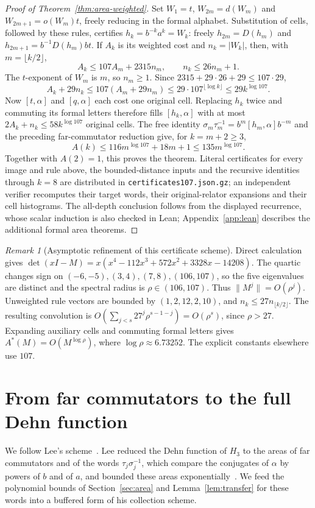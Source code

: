 \documentclass[11pt,a4paper]{article}
\theoremstyle{plain}
\theoremstyle{definition}
\theoremstyle{remark}
\newtheorem{remark}[theorem]{Remark}
\begin{document}
\begin{proof}[Proof of Theorem~\ref{thm:area-weighted}]
Set $W_1=t$, $W_{2m}=d(W_m)$ and $W_{2m+1}=o(W_m)t$, freely reducing in the formal alphabet. Substitution of cells, followed by these
rules, certifies $h_k=b^{-k}a^k=W_k$: freely $h_{2m}=D(h_m)$ and $h_{2m+1}=b^{-1}D(h_m)bt$.
If $A_k$ is its weighted cost and $n_k=|W_k|$, then, with $m=\lfloor k/2\rfloor$,
\[
A_k\le107A_m+2315n_m,\qquad n_k\le26n_m+1.
\]
The $t$-exponent of $W_m$ is $m$, so $n_m\ge1$. Since $2315+29\cdot26+29\le107\cdot29$,
\[
A_k+29n_k\le107(A_m+29n_m)\le29\cdot107^{\lfloor\log k\rfloor}\le29k^{\log107}.
\]
Now $[t,\alpha]$ and $[q,\alpha]$ each cost one original cell. Replacing $h_k$ twice and commuting its formal letters therefore fills
$[h_k,\alpha]$ with at most $2A_k+n_k\le58k^{\log107}$ original cells. The free identity
$\sigma_m\tau_m^{-1}=b^m[h_m,\alpha]b^{-m}$ and the preceding far-commutator reduction give, for $k=m+2\ge3$,
\[
A(k)\le116m^{\log107}+18m+1\le135m^{\log107}.
\]
Together with $A(2)=1$, this proves the theorem. Literal certificates for every image and rule above, the bounded-distance inputs and
the recursive identities through $k=8$ are distributed in \texttt{certificates107.json.gz}; an independent verifier recomputes their target
words, their original-relator expansions and their cell histograms. The all-depth conclusion follows from the displayed recurrence,
whose scalar induction is also checked in Lean; Appendix~\ref{app:lean} describes the additional formal area theorems.
\end{proof}

\begin{remark}[Asymptotic refinement of this certificate scheme]
Direct calculation gives $\det(xI-M)=x(x^4-112x^3+572x^2+3328x-14208)$.
The quartic changes sign on $(-6,-5),(3,4),(7,8),(106,107)$, so the five eigenvalues are distinct and the spectral radius is
$\rho\in(106,107)$. Thus $\|M^j\|=O(\rho^j)$. Unweighted rule vectors are bounded by
$(1,2,12,2,10)$, and $n_k\le27n_{\lfloor k/2\rfloor}$. The resulting convolution is
$O(\sum_{j<s}27^j\rho^{s-1-j})=O(\rho^s)$, since $\rho>27$. Expanding auxiliary cells and commuting formal letters gives
$A^*(M)=O(M^{\log\rho})$, where $\log\rho\approx6.73252$. The explicit constants elsewhere use $107$.
\end{remark}

\section{From far commutators to the full Dehn function}\label{app:dehn}

We follow Lee's scheme~\cite[Section~4.2]{Lee2012}. Lee reduced the Dehn function of $H_3$ to the areas of far commutators and of the
words $\tau_j\sigma_j^{-1}$, which compare the conjugates of $\alpha$ by powers of $b$ and of $a$, and bounded these areas
exponentially~\cite[Lemma~4.7 and Remark~4.8]{Lee2012}. We feed the polynomial bounds of Section~\ref{sec:area} and
Lemma~\ref{lem:transfer} for these words into a buffered form of his collection scheme.
\end{document}
